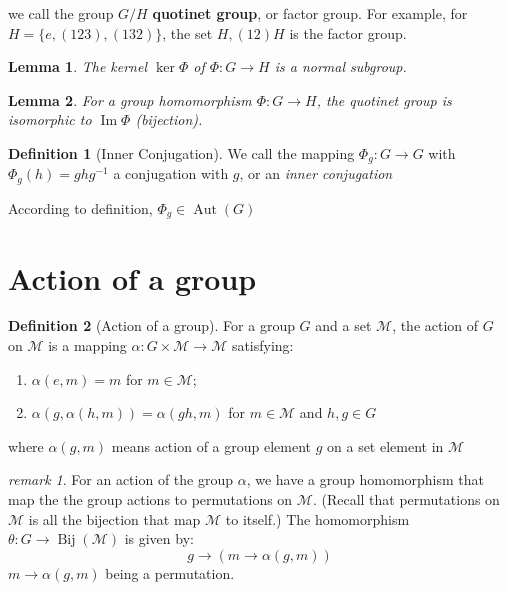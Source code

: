 \documentclass{amsart}
\newcommand{\setM}{\mathcal{M}}
\newtheorem*{lemma}{Lemma}
\theoremstyle{remark}
\newtheorem*{remark}{remark}
\theoremstyle{remark}
\theoremstyle{definition}
\newtheorem*{definition}{Definition}
\DeclareMathOperator{\Aut}{Aut}
\DeclareMathOperator{\Image}{Im}
\DeclareMathOperator{\Bij}{Bij}
\begin{document}
we call the group $G/H$ \textbf{quotinet group}, or factor group.
For example, for $H = \{e,(123),(132)\}$, the set ${H, (12)H}$ is the factor group.

\begin{lemma}
    The kernel $\ker\Phi$ of $\Phi\colon G\to H$ is a normal subgroup.
\end{lemma}

\begin{lemma}
    For a group homomorphism $\Phi\colon G\to H$, the quotinet group is isomorphic to $\Image\Phi$ (bijection).
\end{lemma}

\vspace{10pt}

\begin{definition}
    [Inner Conjugation]
    We call the mapping $\Phi_g\colon G\to G$ with $\Phi_g(h) = ghg^{-1}$ a conjugation with $g$, or an \emph{inner conjugation}
\end{definition}
According to definition, $\Phi_g \in \Aut(G)$


\vspace{10pt}
\section*{Action of a group}

\begin{definition}
    [Action of a group]
    For a group $G$ and a set $\setM$, the action of $G$ on $\setM$ is a mapping 
    $\alpha\colon G\times \setM \to \setM$ satisfying:
    \begin{enumerate}
        \item $\alpha(e,m) = m$ for $m \in \setM$;
        \item $\alpha(g, \alpha(h,m)) = \alpha(gh, m)$ for $m\in \setM$ and $h,g\in G$
    \end{enumerate}
\end{definition}
where $\alpha(g,m)$ means action of a group element $g$ on a set element in $\setM$

\begin{remark}
For an action of the group $\alpha$, 
we have a group homomorphism that map the the group actions to permutations on $\setM$. 
(Recall that permutations on $\setM$ is all the bijection that map $\setM$ to itself.) 
The homomorphism $\theta\colon G \to \Bij(\setM)$ is given by:
\begin{equation*}
    g\to (m\to \alpha(g,m))
\end{equation*}
$m\to \alpha(g,m)$ being a permutation.     
\end{remark}
\end{document}
